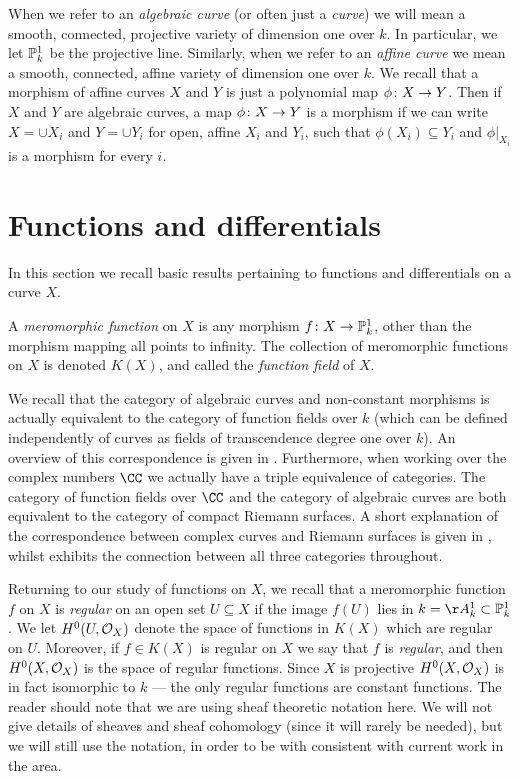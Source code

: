 When we refer to an \emph{algebraic curve} (or often just a \emph{curve}) we will mean a smooth, connected, projective variety of dimension one over $k$.
In particular, we let ${\mathbb P}_k^1$ be the projective line.
Similarly, when we refer to an \emph{affine curve} we mean a smooth, connected, affine variety of dimension one over $k$. %
We recall that a morphism of affine curves $X$ and $Y$ is just a polynomial map $\phi \colon X \rightarrow Y$.
Then if $X$ and $Y$ are algebraic curves, a map $\phi \colon X \rightarrow Y$ is a morphism if we can write $X = \cup X_i$ and $Y = \cup Y_i$ for open, affine $X_i$ and $Y_i$, such that $\phi(X_i) \subseteq Y_i$ and $\phi|_{X_i}$ is a morphism for every $i$.



\section{Functions and differentials}

In this section we recall basic results pertaining to functions and differentials on a curve $X$. 

A \emph{meromorphic function} on $X$ is any morphism $f \colon X \rightarrow {\mathbb P}_k^1$, other than the morphism mapping all points to infinity.
The collection of meromorphic functions on $X$ is denoted $K(X)$, and called the \emph{function field} of $X$.

We recall that the category of algebraic curves and non-constant morphisms is actually equivalent to the category of function fields over $k$ (which can be defined independently of curves as fields of transcendence degree one over $k$).
An overview of this correspondence is given in \cite[Appendix B]{stichtenoth}.
Furthermore, when working over the complex numbers $\CC$ we actually have a triple equivalence of categories.
The category of function fields over $\CC$ and the category of algebraic curves are both equivalent to the category of compact Riemann surfaces. 
A short explanation of the correspondence between complex curves and Riemann surfaces is given in \cite[Chap.\ 1, \S 2]{griffiths}, whilst \cite{miranda} exhibits the connection between all three categories throughout.


Returning to our study of functions on $X$, we recall that a meromorphic function $f$ on $X$ is \emph{regular} on an open set $U \subseteq X$ if the image $f(U)$ lies in $k = \AA_k^1 \subset \PP_k^1$.
We let $H^0(U,{\cal O}_X)$ denote the space of functions in $K(X)$ which are regular on $U$.
Moreover, if $f \in K(X)$ is regular on $X$ we say that $f$ is \emph{regular}, and then $H^0(X,{\cal O}_X)$ is the space of regular functions.
Since $X$ is projective $H^0(X,{\cal O}_X)$ is in fact isomorphic to $k$ --- \ie the only regular functions are constant functions.
The reader should note that we are using sheaf theoretic notation here. 
We will not give details of sheaves and sheaf cohomology (since it will rarely be needed), but we will still use the notation, in order to be with consistent with current work in the area.

